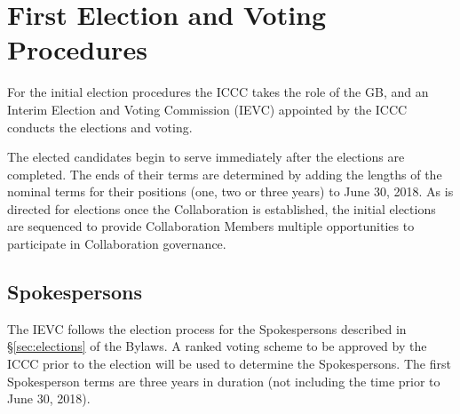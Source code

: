 \documentclass[12pt]{article}
\begin{document}




\appendix
\appendixpage
\addappheadtotoc  %



\section{First Election and Voting Procedures}
\label{app:first_election}

For the initial election procedures the ICCC takes the role of the GB, and an Interim Election and Voting Commission (IEVC) appointed by the ICCC conducts the elections and voting.  

The elected candidates begin to serve immediately after the elections are completed. The ends of their terms are determined by adding the lengths of the nominal terms for their positions (one, two or three years) to June 30, 2018. 
\textcolor{\markcolor}{As is directed for elections once the Collaboration is established, the initial elections are sequenced to provide Collaboration Members multiple opportunities to participate in Collaboration governance. }

\subsection{Spokespersons} 
The IEVC follows the election process \textcolor{\markcolor} {for the Spokespersons}  described in \S\ref{sec:elections} of the Bylaws.  \textcolor{\markcolor}{   %
A ranked voting scheme to be approved by the ICCC prior to the election will be used to determine the Spokespersons.  The first Spokesperson terms are three years in duration (not including the time prior to June 30, 2018). }%
\end{document}
